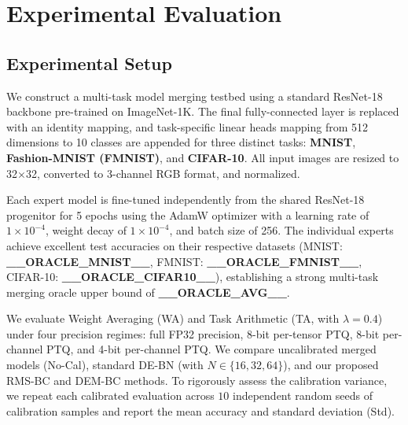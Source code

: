 \documentclass{article}
\begin{document}
\section{Experimental Evaluation}
\subsection{Experimental Setup}
We construct a multi-task model merging testbed using a standard ResNet-18 backbone pre-trained on ImageNet-1K. The final fully-connected layer is replaced with an identity mapping, and task-specific linear heads mapping from 512 dimensions to 10 classes are appended for three distinct tasks: \textbf{MNIST}, \textbf{Fashion-MNIST (FMNIST)}, and \textbf{CIFAR-10}. All input images are resized to 32$\times$32, converted to 3-channel RGB format, and normalized.

Each expert model is fine-tuned independently from the shared ResNet-18 progenitor for 5 epochs using the AdamW optimizer with a learning rate of $1 \times 10^{-4}$, weight decay of $1 \times 10^{-4}$, and batch size of 256. The individual experts achieve excellent test accuracies on their respective datasets (MNIST: \textbf{__ORACLE_MNIST__}, FMNIST: \textbf{__ORACLE_FMNIST__}, CIFAR-10: \textbf{__ORACLE_CIFAR10__}), establishing a strong multi-task merging oracle upper bound of \textbf{__ORACLE_AVG__}.

We evaluate Weight Averaging (WA) and Task Arithmetic (TA, with $\lambda = 0.4$) under four precision regimes: full FP32 precision, 8-bit per-tensor PTQ, 8-bit per-channel PTQ, and 4-bit per-channel PTQ. We compare uncalibrated merged models (No-Cal), standard DE-BN (with $N \in \{16, 32, 64\}$), and our proposed RMS-BC and DEM-BC methods. To rigorously assess the calibration variance, we repeat each calibrated evaluation across $10$ independent random seeds of calibration samples and report the mean accuracy and standard deviation (Std).
\end{document}
